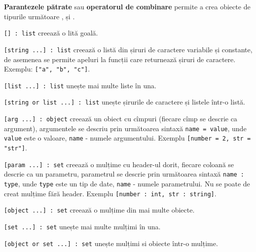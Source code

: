 {\bf Parantezele pătrate} sau {\bf operatorul de combinare} permite a crea obiecte de tipurile următoare \listtype{}, \set{} și \object{}.

\texttt{[] : list} creează o lită goală.

\texttt{[string ...] : list} creează o listă din șiruri de caractere variabile și constante, de asemenea se permite apeluri la funcții care returnează șiruri de caractere. Exemplu: \texttt{["a", "b", "c"]}.

\texttt{[list ...] : list} unește mai multe liste în una.

\texttt{[string or list ...] : list} unește șirurile de caractere și listele într-o listă.

\texttt{[arg ...] : object} creează un obiect cu cîmpuri (fiecare cîmp se descrie ca argument), argumentele se descriu prin următoarea sintaxă \texttt{name = value}, unde \texttt{value} este o valoare, \texttt{name} - numele argumentului. Exemplu \texttt{[number = 2, str = "str"]}.

\texttt{[param ...] : set} creează o mulțime cu header-ul dorit, fiecare coloană se descrie ca un parametru, parametrul se descrie prin următoarea sintaxă \texttt{name : type}, unde \texttt{type} este un tip de date, \texttt{name} - numele parametrului. Nu se poate de creat mulțime fără header. Exemplu \texttt{[number : int, str : string]}.

\texttt{[object ...] : set} creează o mulțime din mai multe obiecte.

\texttt{[set ...] : set} unește mai multe mulțimi în una.

\texttt{[object or set ...] : set} unește mulțimi si obiecte într-o mulțime.

